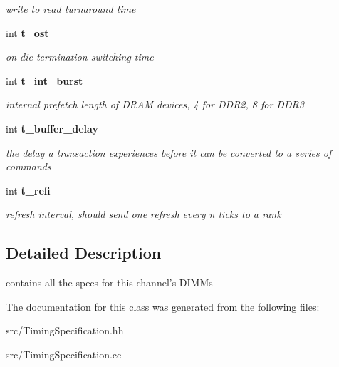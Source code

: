 \begin{DoxyCompactItemize}
\begin{DoxyCompactList}\small\item\em write to read turnaround time \item\end{DoxyCompactList}\item 
int {\bf t\_\-ost}\label{class_d_r_a_msim_i_i_1_1_timing_specification_ae54f6727a9f82dc02dd193ecddf5c8cd}

\begin{DoxyCompactList}\small\item\em on-\/die termination switching time \item\end{DoxyCompactList}\item 
int {\bf t\_\-int\_\-burst}\label{class_d_r_a_msim_i_i_1_1_timing_specification_a6d72dcc4ce25b88cb647e7f9b63fad35}

\begin{DoxyCompactList}\small\item\em internal prefetch length of DRAM devices, 4 for DDR2, 8 for DDR3 \item\end{DoxyCompactList}\item 
int {\bf t\_\-buffer\_\-delay}\label{class_d_r_a_msim_i_i_1_1_timing_specification_a31d7e2bb92cbfbac8e4d726b47b94a40}

\begin{DoxyCompactList}\small\item\em the delay a transaction experiences before it can be converted to a series of commands \item\end{DoxyCompactList}\item 
int {\bf t\_\-refi}\label{class_d_r_a_msim_i_i_1_1_timing_specification_a7c3fcb83affbf18fa739921d277178de}

\begin{DoxyCompactList}\small\item\em refresh interval, should send one refresh every n ticks to a rank \item\end{DoxyCompactList}\end{DoxyCompactItemize}


\subsection{Detailed Description}
contains all the specs for this channel's DIMMs 

The documentation for this class was generated from the following files:\begin{DoxyCompactItemize}
\item 
src/TimingSpecification.hh\item 
src/TimingSpecification.cc\end{DoxyCompactItemize}
